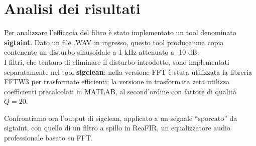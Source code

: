 \section{Analisi dei risultati}
Per analizzare l'efficacia del filtro è stato implementato un tool denominato \textbf{sigtaint}.
Dato un file .WAV in ingresso, questo tool produce una copia contenente un disturbo sinusoidale a 1 kHz attenuato a -10 dB.\\
I filtri, che tentano di eliminare il disturbo introdotto, sono implementati separatamente nel tool \textbf{sigclean}:
nella versione FFT è stata utilizzata la libreria FFTW3\cite{fftw} per trasformate efficienti;
la versione in trasformata zeta utilizza coefficienti precalcolati in MATLAB\cite{matfil}, al second'ordine con fattore di qualità $Q = 20$.

Confrontiamo ora l'output di sigclean, applicato a un segnale ``sporcato'' da sigtaint,
con quello di un filtro a spillo in ReaFIR\cite{cockos}, un equalizzatore audio professionale basato su FFT.

